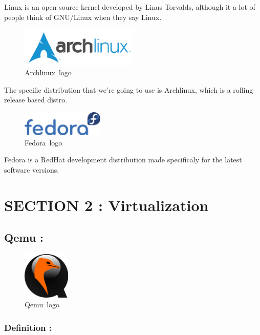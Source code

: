 \documentclass[
  14pt,
  english,
  a4paper,
]{scrreprt}
\begin{document}
Linux is an open source kernel developed by Linus Torvalds, although it
a lot of people think of GNU/Linux when they say Linux.

\begin{figure}
\centering
\includegraphics[width=0.5\textwidth,height=\textheight]{figures/Archlinux-logo.png}
\caption{Archlinux~logo}
\end{figure}

The specific distribution that we're going to use is Archlinux, which is
a rolling release based distro.

\begin{figure}
\centering
\includegraphics[width=0.35\textwidth,height=\textheight]{figures/Fedora_logo.png}
\caption{Fedora~logo}
\end{figure}

Fedora is a RedHat development distribution made specificaly for the
latest software versions.

\hypertarget{section-2-virtualization}{%
\section{SECTION 2 : Virtualization}\label{section-2-virtualization}}

\hypertarget{qemu}{%
\subsection{Qemu :}\label{qemu}}

\begin{figure}
\centering
\includegraphics[width=0.2\textwidth,height=\textheight]{figures/Qemu-logo.png}
\caption{Qemu~logo}
\end{figure}

\hypertarget{definition-6}{%
\subsubsection{Definition :}\label{definition-6}}
\end{document}
